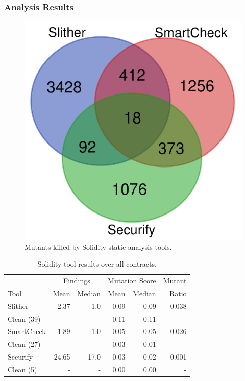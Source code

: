 \subsubsection{Analysis Results}

\begin{figure}
  \centering
  \includegraphics[width=0.35\columnwidth]{solidity.png}
  \caption{Mutants killed by Solidity static analysis tools.}
  \label{fig:solidityvenn}
\end{figure}

\begin{table}
  \begin{tabular}{l|r|r|r|r|r}
    & \multicolumn{2}{|c|}{Findings} & \multicolumn{2}{|c|}{Mutation Score}  & Mutant \\
    Tool & Mean & Median & Mean & Median & Ratio\\
    \hline
    \hline
    Slither & 2.37 & 1.0 & 0.09 & 0.09 & 0.038 \\
    Clean (39) & - & - & 0.11 & 0.11 & -\\
    \hline
    SmartCheck & 1.89 & 1.0 & 0.05 & 0.05 & 0.026 \\
    Clean (27) & - & - & 0.03 & 0.01 & - \\
    \hline
    Securify & 24.65 & 17.0 & 0.03 & 0.02 &  0.001 \\
    Clean (5) & - & - & 0.00 & 0.00 & - \\
    \hline
    
  \end{tabular}
  \caption{Solidity tool results over all contracts.}
  \label{tab:scoresolidity}
\end{table}


